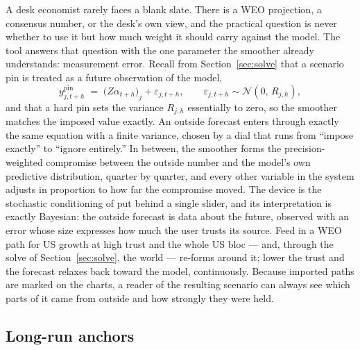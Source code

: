 \documentclass[11pt]{article}
\begin{document}
A desk economist rarely faces a blank slate. There is a WEO projection, a consensus number,
or the desk's own view, and the practical question is never whether to use it but how much
weight it should carry against the model. The tool answers that question with the one
parameter the smoother already understands: measurement error. Recall from
Section~\ref{sec:solve} that a scenario pin is treated as a future observation of the model,
\begin{equation}\label{eq:softpin}
  y^{\mathrm{pin}}_{j,t+h} \;=\; \bigl(Z\alpha_{t+h}\bigr)_j + \varepsilon_{j,t+h},
  \qquad \varepsilon_{j,t+h}\sim\mathcal N(0,\,R_{j,h}),
\end{equation}
and that a hard pin sets the variance $R_{j,h}$ essentially to zero, so the smoother matches
the imposed value exactly. An outside forecast enters through exactly the same equation with
a finite variance, chosen by a dial that runs from ``impose exactly'' to ``ignore
entirely.'' In between, the smoother forms the precision-weighted compromise between the
outside number and the model's own predictive distribution, quarter by quarter, and every
other variable in the system adjusts in proportion to how far the compromise moved. The
device is the stochastic conditioning of \citet{WaggonerZha1999} put behind a single slider,
and its interpretation is exactly Bayesian: the outside forecast is data about the future,
observed with an error whose size expresses how much the user trusts its source. Feed in a
WEO path for US growth at high trust and the whole US bloc --- and, through the solve of
Section~\ref{sec:solve}, the world --- re-forms around it; lower the trust and the forecast
relaxes back toward the model, continuously. Because imported paths are marked on the
charts, a reader of the resulting scenario can always see which parts of it came from
outside and how strongly they were held.

\subsection{Long-run anchors}\label{sec:anchors}
\end{document}
